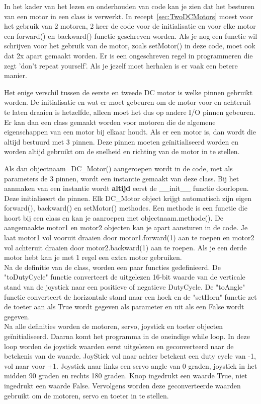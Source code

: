 In het kader van het lezen en onderhouden van code kan je zien dat het besturen van een motor in een class is verwerkt. In recept~\ref{sec:TwoDCMotors} moest voor het gebruik van 2 motoren, 2 keer de code voor de initialisatie en voor elke motor een forward() en backward() functie geschreven worden. Als je nog een functie wil schrijven voor het gebruik van de motor, zoals setMotor() in deze code, moet ook dat 2x apart gemaakt worden. Er is een ongeschreven regel in programmeren die zegt 'don't repeat yourself'. Als je jezelf moet herhalen is er vaak een betere manier. 

Het enige verschil tussen de eerste en tweede DC motor is welke pinnen gebruikt worden. De initialisatie en wat er moet gebeuren om de motor voor en achteruit te laten draaien is hetzelfde, alleen moet het dus op andere I/O pinnen gebeuren. Er kan dan een class gemaakt worden voor motoren die de algemene eigenschappen van een motor bij elkaar houdt. Als er een motor is, dan wordt die altijd bestuurd met 3 pinnen. Deze pinnen moeten ge\"initialiseerd worden en worden altijd gebruikt om de snelheid en richting van de motor in te stellen. 

Als dan objectnaam=DC\_Motor() aangeroepen wordt in de code, met als parameters de 3 pinnen, wordt een instantie gemaakt van deze class. Bij het aanmaken van een instantie wordt \textbf{altijd} eerst de \_\_init\_\_ functie doorlopen. Deze initialiseert de pinnen. Elk DC\_Motor object krijgt automatisch zijn eigen forward(), backward() en setMotor() methodes.  Een methode is een functie die hoort bij een class en kan je aanroepen met objectnaam.methode(). De aangemaakte motor1 en motor2 objecten kan je apart aansturen in de code. Je laat motor1 vol vooruit draaien door motor1.forward(1) aan te roepen en motor2 vol achteruit draaien door motor2.backward(1) aan te roepen. Als je een derde motor hebt kan je met 1 regel een extra motor gebruiken.\\

Na de definitie van de class, worden een paar functies gedefinieerd. De "toDutyCycle" functie converteert de uitgelezen 16-bit waarde van de verticale stand van de joystick naar een positieve of negatieve DutyCycle. De "toAngle" functie converteert de horizontale stand naar een hoek en de "setHorn" functie zet de toeter aan als True wordt gegeven als parameter en uit als een False wordt gegeven.\\

Na alle definities worden de motoren, servo, joystick en toeter objecten ge\"initialiseerd. Daarna komt het programma in de oneindige while loop. In deze loop worden de joystick waarden eerst uitgelezen en geconverteerd naar de betekenis van de waarde. JoyStick vol naar achter betekent een duty cycle van -1, vol naar voor +1. Joystick naar links een servo angle van 0 graden, joystick in het midden 90 graden en rechts 180 graden. Knop ingedrukt een waarde True, niet ingedrukt een waarde False. Vervolgens worden deze geconverteerde waarden gebruikt om de motoren, servo en toeter in te stellen.

